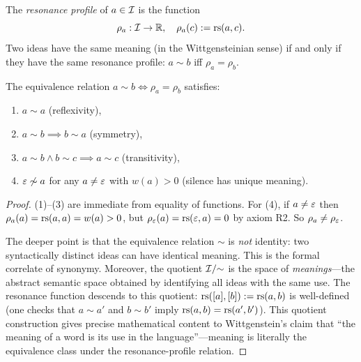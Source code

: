 \begin{definition}
\label{def:resonance-profile}
The \emph{resonance profile} of $a \in \mathcal{I}$ is the function
\[
\rho_a : \mathcal{I} \to \mathbb{R}, \quad \rho_a(c) := \mathrm{rs}(a, c).
\]
Two ideas have the same meaning (in the Wittgensteinian sense) if and only
if they have the same resonance profile: $a \sim b$ iff $\rho_a = \rho_b$.
\end{definition}

\begin{theorem}
\label{thm:meaning-is-use}
The equivalence relation $a \sim b \iff \rho_a = \rho_b$ satisfies:
\begin{enumerate}
\item $a \sim a$ (reflexivity),
\item $a \sim b \implies b \sim a$ (symmetry),
\item $a \sim b \land b \sim c \implies a \sim c$ (transitivity),
\item $\varepsilon \not\sim a$ for any $a \neq \varepsilon$ with $w(a) > 0$ (silence has unique meaning).
\end{enumerate}
\end{theorem}

\begin{proof}
(1)--(3) are immediate from equality of functions. For (4), if $a \neq \varepsilon$
then $\rho_a(a) = \mathrm{rs}(a, a) = w(a) > 0$, but $\rho_\varepsilon(a) = \mathrm{rs}(\varepsilon, a) = 0$
by axiom R2. So $\rho_a \neq \rho_\varepsilon$.

The deeper point is that the equivalence relation $\sim$ is \emph{not}
identity: two syntactically distinct ideas can have identical meaning.
This is the formal correlate of synonymy. Moreover, the quotient
$\mathcal{I} / {\sim}$ is the space of \emph{meanings}---the abstract semantic
space obtained by identifying all ideas with the same use.
The resonance function descends to this quotient:
$\mathrm{rs}([a], [b]) := \mathrm{rs}(a, b)$ is well-defined (one checks that
$a \sim a'$ and $b \sim b'$ imply $\mathrm{rs}(a, b) = \mathrm{rs}(a', b')$).
This quotient construction gives precise mathematical content to
Wittgenstein's claim that ``the meaning of a word is its use in the
language''---meaning is literally the equivalence class under the
resonance-profile relation.
\end{proof}

